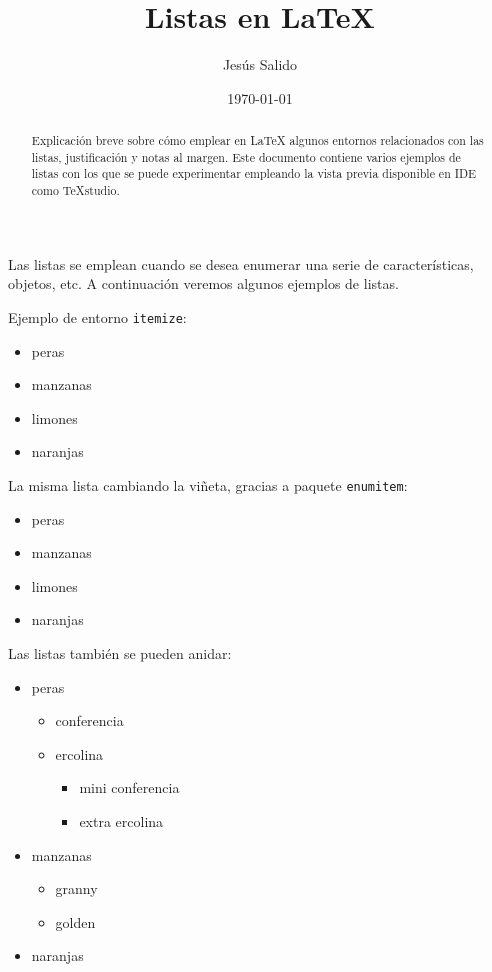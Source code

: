 \documentclass[11pt,a4paper]{article}
\author{Jesús Salido}
\title{Listas en \LaTeX{}}
\date{\today}
\begin{document}
\maketitle

\begin{abstract}
	Explicación breve sobre cómo emplear en \LaTeX{} algunos entornos relacionados con las listas, justificación y notas al margen. Este documento contiene varios ejemplos de listas con los que se puede experimentar empleando la vista previa disponible en IDE como \TeX studio. 
\end{abstract}


Las listas se emplean cuando se desea enumerar una serie de características, objetos, etc. A continuación veremos algunos ejemplos de listas.

\noindent Ejemplo de entorno {\tt itemize}:

\begin{itemize}
	\item peras
	\item manzanas
    \item 	limones
    \item 	naranjas
\end{itemize}

\noindent La misma lista cambiando la viñeta, gracias a paquete \texttt{enumitem}:
\begin{itemize}[]
	\item peras
	\item manzanas
	\item limones
	\item naranjas
\end{itemize}


Las listas también se pueden anidar:
\begin{itemize}
	\item peras
	\begin{itemize}
		\item conferencia
		\item ercolina
    	\begin{itemize}
    		\item mini conferencia
    		\item extra ercolina
    	\end{itemize}
	\end{itemize}
	\item manzanas
	\begin{itemize}
		\item granny
		\item golden 
	\end{itemize}
	\item naranjas
\end{itemize}
\end{document}
